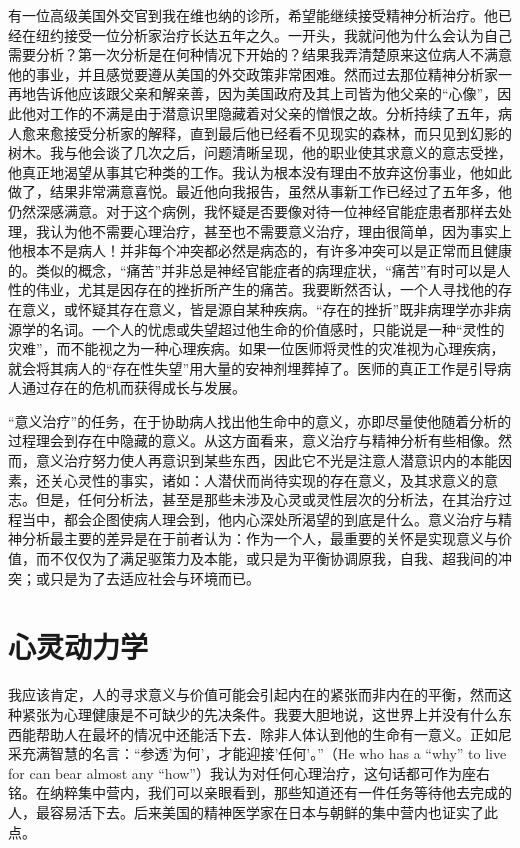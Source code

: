 \documentclass[11pt,oneside]{book}
\begin{document}
\begin{common-format}
有一位高级美国外交官到我在维也纳的诊所，希望能继续接受精神分析治疗。他已经在纽约接受一位分析家治疗长达五年之久。一开头，我就问他为什么会认为自己需要分析？第一次分析是在何种情况下开始的？结果我弄清楚原来这位病人不满意他的事业，并且感觉要遵从美国的外交政策非常困难。然而过去那位精神分析家一再地告诉他应该跟父亲和解亲善，因为美国政府及其上司皆为他父亲的“心像”，因此他对工作的不满是由于潜意识里隐藏着对父亲的憎恨之故。分析持续了五年，病人愈来愈接受分析家的解释，直到最后他已经看不见现实的森林，而只见到幻影的树木。我与他会谈了几次之后，问题清晰呈现，他的职业使其求意义的意志受挫，他真正地渴望从事其它种类的工作。我认为根本没有理由不放弃这份事业，他如此做了，结果非常满意喜悦。最近他向我报告，虽然从事新工作已经过了五年多，他仍然深感满意。对于这个病例，我怀疑是否要像对待一位神经官能症患者那样去处理，我认为他不需要心理治疗，甚至也不需要意义治疗，理由很简单，因为事实上他根本不是病人！并非每个冲突都必然是病态的，有许多冲突可以是正常而且健康的。类似的概念，“痛苦”并非总是神经官能症者的病理症状，“痛苦”有时可以是人性的伟业，尤其是因存在的挫折所产生的痛苦。我要断然否认，一个人寻找他的存在意义，或怀疑其存在意义，皆是源自某种疾病。“存在的挫折”既非病理学亦非病源学的名词。一个人的忧虑或失望超过他生命的价值感时，只能说是一种“灵性的灾难”，而不能视之为一种心理疾病。如果一位医师将灵性的灾准视为心理疾病，就会将其病人的“存在性失望”用大量的安神剂埋葬掉了。医师的真正工作是引导病人通过存在的危机而获得成长与发展。

“意义治疗”的任务，在于协助病人找出他生命中的意义，亦即尽量使他随着分析的过程理会到存在中隐藏的意义。从这方面看来，意义治疗与精神分析有些相像。然而，意义治疗努力使人再意识到某些东西，因此它不光是注意人潜意识内的本能因素，还关心灵性的事实，诸如：人潜伏而尚待实现的存在意义，及其求意义的意志。但是，任何分析法，甚至是那些未涉及心灵或灵性层次的分析法，在其治疗过程当中，都会企图使病人理会到，他内心深处所渴望的到底是什么。意义治疗与精神分析最主要的差异是在于前者认为：作为一个人，最重要的关怀是实现意义与价值，而不仅仅为了满足驱策力及本能，或只是为平衡协调原我，自我、超我间的冲突；或只是为了去适应社会与环境而已。


\section{心灵动力学}
我应该肯定，人的寻求意义与价值可能会引起内在的紧张而非内在的平衡，然而这种紧张为心理健康是不可缺少的先决条件。我要大胆地说，这世界上并没有什么东西能帮助人在最坏的情况中还能活下去．除非人体认到他的生命有一意义。正如尼采充满智慧的名言：“参透'为何'，才能迎接'任何'。”（He who has a “why” to live for can bear almost any “how”）我认为对任何心理治疗，这句话都可作为座右铭。在纳粹集中营内，我们可以亲眼看到，那些知道还有一件任务等待他去完成的人，最容易活下去。后来美国的精神医学家在日本与朝鲜的集中营内也证实了此点。


\end{common-format}
\end{document}
